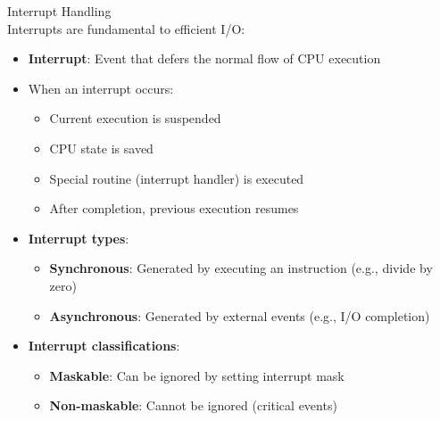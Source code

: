 \begin{definition}{Interrupt Handling}\\
    Interrupts are fundamental to efficient I/O:
    \begin{itemize}
        \item \textbf{Interrupt}: Event that defers the normal flow of CPU execution
        \item When an interrupt occurs:
            \begin{itemize}
                \item Current execution is suspended
                \item CPU state is saved
                \item Special routine (interrupt handler) is executed
                \item After completion, previous execution resumes
            \end{itemize}
        \item \textbf{Interrupt types}:
            \begin{itemize}
                \item \textbf{Synchronous}: Generated by executing an instruction (e.g., divide by zero)
                \item \textbf{Asynchronous}: Generated by external events (e.g., I/O completion)
            \end{itemize}
        \item \textbf{Interrupt classifications}:
            \begin{itemize}
                \item \textbf{Maskable}: Can be ignored by setting interrupt mask
                \item \textbf{Non-maskable}: Cannot be ignored (critical events)
            \end{itemize}
    \end{itemize}
\end{definition}

